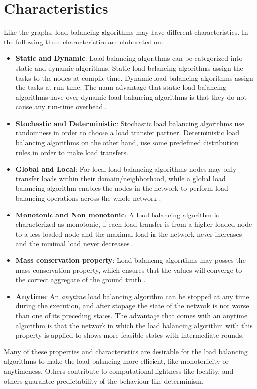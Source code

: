 \section{Characteristics}\label{sec:algoCharacteristics}
Like the graphs, load balancing algorithms may have different characteristics. In the following these characteristics are elaborated on:
\begin{itemize}
    \item \textbf{Static and Dynamic}: Load balancing algorithms can be categorized into static and dynamic algorithms. Static load balancing algorithms assign the tasks to the nodes at compile time. Dynamic load balancing algorithms assign the tasks at run-time. The main advantage that static load balancing algorithms have over dynamic load balancing algorithms is that they do not cause any run-time overhead \cite{Bokhari}.
    \item \textbf{Stochastic and Deterministic}: Stochastic load balancing algorithms use randomness in order to choose a load transfer partner. Deterministic load balancing algorithms on the other hand, use some predefined distribution rules in order to make load transfers. \cite{ChengzhongFrancis}
    \item \textbf{Global and Local}: For local load balancing algorithms nodes may only transfer loads within their domain/neighborhood, while a global load balancing algorithm enables the nodes in the network to perform load balancing operations across the whole network \cite{ChengzhongFrancis}. 
    \item \textbf{Monotonic and Non-monotonic}: A load balancing algorithm is characterized as monotonic, if each load transfer is from a higher loaded node to a less loaded node and the maximal load in the network never increases and the minimal load never decreases \cite{Dinitz2023DAB}.
    \item \textbf{Mass conservation property}: Load balancing algorithms may posses the mass conservation property, which ensures that the values will converge to the correct aggregate of the ground truth \cite{nugroho2023PushPullSumDataAg}.
    \item \textbf{Anytime}: An \textit{anytime} load balancing algorithm can be stopped at any time during the execution, and after stopage the state of the network is not worse than one of its preceding states. The advantage that comes with an anytime algorithm is that the network in which the load balancing algorithm with this property is applied to shows more feasible states with intermediate rounds. \cite{Dinitz2023DAB}
\end{itemize}
Many of these properties and characteristics are desirable for the load balancing algorithms to make the load balancing more efficient, like monotonicity or anytimeness. Others contribute to computational lightness like locality, and others guarantee predictability of the behaviour like determinism.

